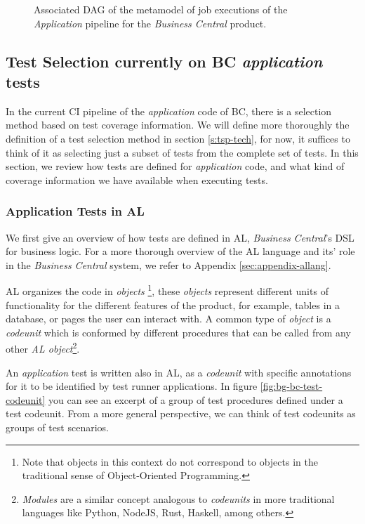\begin{figure}
    \centering
    \def\svgscale{0.1}
    
    \caption{Associated DAG of the metamodel of job executions of the \emph{Application} pipeline for the \emph{Business Central} product.}
    \label{fig:full-job-metamodel-dag}
\end{figure}

\subsection{Test Selection currently on BC \emph{application} tests}
\label{sec:bg-bc-test-selection-currently}

In the current CI pipeline of the \emph{application} code of BC, there is 
a selection method based on test coverage information. We will
define more thoroughly the definition of a test selection method in section \ref{s:tsp-tech},
for now, it suffices to think of it as selecting just a subset of tests from the complete
set of tests. In this section, we review how tests are defined for \emph{application} code, and what kind
of coverage information we have available when executing tests.

\subsubsection{Application Tests in AL}\label{sec:app-tests-al}
We first give an overview of how tests are defined in AL, \emph{Business Central}'s DSL for business logic.  
For a more thorough overview of the AL language and its' role in the \emph{Business Central} system, 
we refer to Appendix \ref{sec:appendix-allang}.

AL organizes the code in \emph{objects} \footnote{Note that objects in this context do not 
correspond to objects in the traditional sense of Object-Oriented Programming.}, these
\emph{objects} represent different units of functionality for the different features of the
product, for example, tables in a database, or pages the user can interact with. A common 
type of \emph{object} is a \emph{codeunit} which is conformed by different procedures that
can be called from any other \emph{AL object}\footnote{\emph{Modules} are a similar concept analogous
to \emph{codeunits} in more traditional languages like Python, NodeJS, Rust, Haskell, among others.}.

An \emph{application} test is written also in AL, as a \emph{codeunit} with specific annotations for it to 
be identified by test runner applications. In figure \ref{fig:bg-bc-test-codeunit} you can see
an excerpt of a group of test procedures defined under a test codeunit. From a more general perspective, 
we can think of test codeunits as groups of test scenarios.

